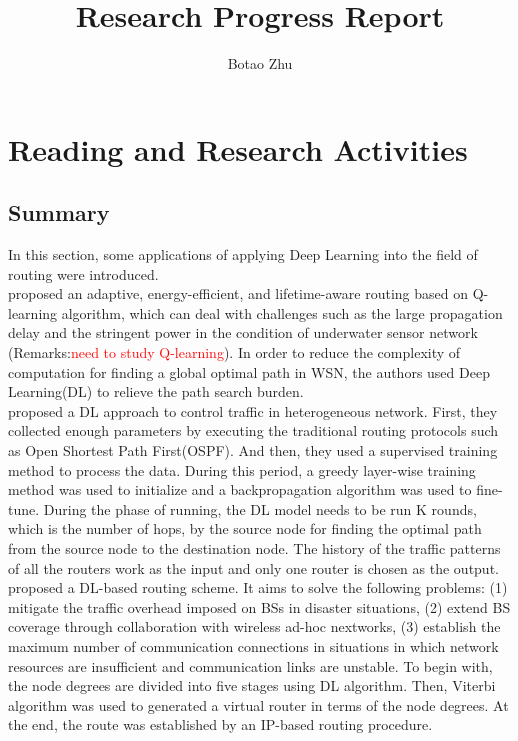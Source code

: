 \documentclass[11pt]{report}
\title{Research Progress Report}
\author{Botao Zhu}
\begin{document}
	
	\maketitle
	 \chead{} 
	 \cfoot{} 
	\renewcommand{\footrulewidth}{1.0pt}
	\renewcommand{\headrulewidth}{2.0pt}
	\renewcommand{\arraystretch}{1.3}
	\pagestyle{fancy}
	
	\renewcommand{\thesection}{\arabic{section}}
	
	\section{Reading and Research Activities}
	
	\subsection{Summary}
	In this section, some applications of applying Deep Learning into the field of routing were introduced.\\
	
	\noindent\cite{5408367} proposed an adaptive, energy-efficient, and lifetime-aware routing based on Q-learning algorithm, which can deal with challenges such as the large propagation delay and the stringent power in the condition of underwater sensor network (Remarks:\textcolor{red}{need to study Q-learning}). In order to reduce the complexity of computation for finding a global optimal path in WSN, the authors used Deep Learning(DL) to relieve the path search burden.\\

	\noindent\cite{7792369} proposed a DL approach to control traffic in heterogeneous network. First, they collected enough parameters by executing the traditional routing protocols such as Open Shortest Path First(OSPF). And then, they used a supervised training method to process the data. During this period, a greedy layer-wise training method was used to initialize and a backpropagation algorithm was used to fine-tune. During the phase of running, the DL model needs to be run K rounds, which is the number of hops, by the source node for finding the optimal path from the source node to the destination node. The history of the traffic patterns of all the routers work as the input and only one router is chosen as the output.\\
	
	\noindent\cite{YangMinLee} proposed a DL-based routing scheme. It aims to solve the following problems: (1) mitigate the traffic overhead imposed on BSs in disaster situations, (2) extend BS coverage through collaboration with wireless ad-hoc nextworks, (3) establish the maximum number of communication connections in situations in which network resources are insufficient and communication links are unstable. To begin with, the node degrees are divided into five stages using DL algorithm. Then, Viterbi algorithm was used to generated a virtual router in terms of the node degrees. At the end, the route was established by an IP-based routing procedure.\\
	
\end{document}
